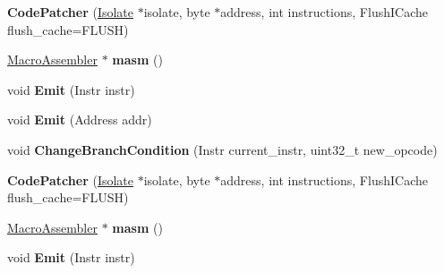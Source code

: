 \begin{DoxyCompactItemize}
\item 
{\bfseries Code\+Patcher} (\hyperlink{classv8_1_1internal_1_1_isolate}{Isolate} $\ast$isolate, byte $\ast$address, int instructions, Flush\+I\+Cache flush\+\_\+cache=F\+L\+U\+SH)\hypertarget{classv8_1_1internal_1_1_code_patcher_a6437c3f8f928a65aa12b0a188c84c137}{}\label{classv8_1_1internal_1_1_code_patcher_a6437c3f8f928a65aa12b0a188c84c137}

\item 
\hyperlink{classv8_1_1internal_1_1_macro_assembler}{Macro\+Assembler} $\ast$ {\bfseries masm} ()\hypertarget{classv8_1_1internal_1_1_code_patcher_abb06694a38d62fd0a065cf42f2d025e2}{}\label{classv8_1_1internal_1_1_code_patcher_abb06694a38d62fd0a065cf42f2d025e2}

\item 
void {\bfseries Emit} (Instr instr)\hypertarget{classv8_1_1internal_1_1_code_patcher_ac0394155d6f5e17721942404e6d3e486}{}\label{classv8_1_1internal_1_1_code_patcher_ac0394155d6f5e17721942404e6d3e486}

\item 
void {\bfseries Emit} (Address addr)\hypertarget{classv8_1_1internal_1_1_code_patcher_a11eaccf67a0e270278fc1d0baaa74462}{}\label{classv8_1_1internal_1_1_code_patcher_a11eaccf67a0e270278fc1d0baaa74462}

\item 
void {\bfseries Change\+Branch\+Condition} (Instr current\+\_\+instr, uint32\+\_\+t new\+\_\+opcode)\hypertarget{classv8_1_1internal_1_1_code_patcher_a0fa077af3fd1e2b454bb2a78a958676d}{}\label{classv8_1_1internal_1_1_code_patcher_a0fa077af3fd1e2b454bb2a78a958676d}

\item 
{\bfseries Code\+Patcher} (\hyperlink{classv8_1_1internal_1_1_isolate}{Isolate} $\ast$isolate, byte $\ast$address, int instructions, Flush\+I\+Cache flush\+\_\+cache=F\+L\+U\+SH)\hypertarget{classv8_1_1internal_1_1_code_patcher_a6437c3f8f928a65aa12b0a188c84c137}{}\label{classv8_1_1internal_1_1_code_patcher_a6437c3f8f928a65aa12b0a188c84c137}

\item 
\hyperlink{classv8_1_1internal_1_1_macro_assembler}{Macro\+Assembler} $\ast$ {\bfseries masm} ()\hypertarget{classv8_1_1internal_1_1_code_patcher_abb06694a38d62fd0a065cf42f2d025e2}{}\label{classv8_1_1internal_1_1_code_patcher_abb06694a38d62fd0a065cf42f2d025e2}

\item 
void {\bfseries Emit} (Instr instr)\hypertarget{classv8_1_1internal_1_1_code_patcher_ac0394155d6f5e17721942404e6d3e486}{}\label{classv8_1_1internal_1_1_code_patcher_ac0394155d6f5e17721942404e6d3e486}


\end{DoxyCompactItemize}
